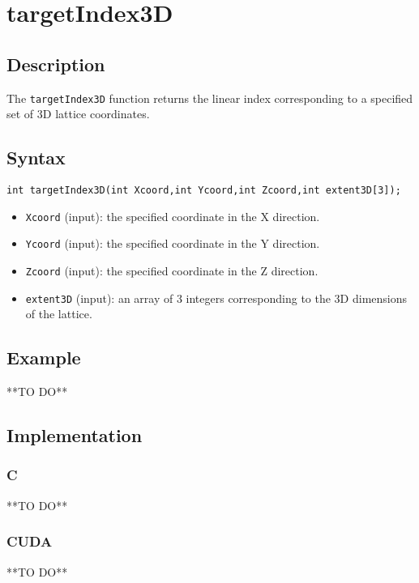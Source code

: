 \newpage
\section{targetIndex3D}

\subsection{Description}

The \verb+targetIndex3D+ function returns the linear index corresponding to a specified set of 3D lattice coordinates.

\subsection{Syntax}
\begin{verbatim}
int targetIndex3D(int Xcoord,int Ycoord,int Zcoord,int extent3D[3]);
\end{verbatim}

\begin{itemize}
\item \verb+Xcoord+ (input): the specified coordinate in the X direction.
\item \verb+Ycoord+ (input): the specified coordinate in the Y direction.
\item \verb+Zcoord+ (input): the specified coordinate in the Z direction.
\item \verb+extent3D+ (input): an array of 3 integers corresponding to the 3D dimensions of the lattice.
\end{itemize}


\subsection{Example}
**TO DO**
\subsection{Implementation}
\subsubsection{C}
**TO DO**
\subsubsection{CUDA}
**TO DO**
